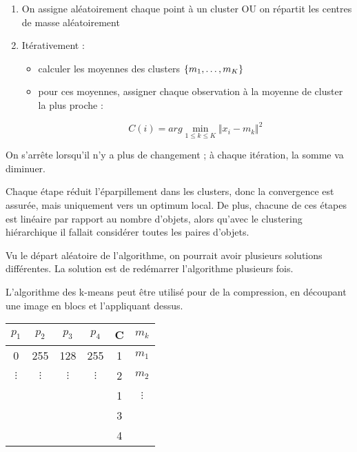 		\begin{enumerate}
			\item On assigne aléatoirement chaque point à un cluster OU on répartit les centres de masse aléatoirement
			\item Itérativement :
			
			\begin{itemize}
				\item calculer les moyennes des clusters $\lbrace m_1 , \dots , m_K \rbrace$
				\item pour ces moyennes, assigner chaque observation à la moyenne de cluster la plus proche :
				
				$$C(i) = arg \min_{1 \leq k \leq K} \Vert x_i - m_k \Vert^2$$
			\end{itemize}
		\end{enumerate}
		
		On s'arrête lorsqu'il n'y a plus de changement ; à chaque itération, la somme va diminuer.
		
		
		
		
		Chaque étape réduit l'éparpillement dans les clusters, donc la convergence est assurée, mais uniquement vers un optimum local. De plus, chacune de ces étapes est linéaire par rapport au nombre d'objets, alors qu'avec le clustering hiérarchique il fallait considérer toutes les paires d'objets.
		
		Vu le départ aléatoire de l'algorithme, on pourrait avoir plusieurs solutions différentes. La solution est de redémarrer l'algorithme plusieurs fois.
		
		L'algorithme des k-means peut être utilisé pour de la compression, en découpant une image en blocs et l'appliquant dessus.
		
		
		\begin{center}
		\begin{tabular}{|c|c|c|c||c|c|}
		\hline
		$p_1$ & $p_2$ & $p_3$ & $p_4$ & C & $m_k$ \\ 
		\hline\hline
		0 & 255 & 128 & 255 & 1 & $m_1$ \\ 
		\hline 
		$\vdots$ & $\vdots$ & $\vdots$ & $\vdots$ & 2 & $m_2$ \\ 
		\hline 
		  &   &   &   & 1 & $\vdots$ \\ 
		\hline 
		 &   &   &   & 3 &  \\ 
		\hline 
		 &  &  &  & 4 &  \\ 
		\hline 
		\end{tabular} 
		\end{center}
		
